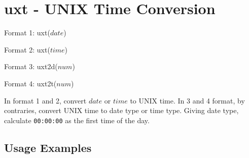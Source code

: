 %

\section{uxt - UNIX Time Conversion\label{sect:uxt}}

Format 1: uxt($date$)

Format 2: uxt($time$)

Format 3: uxt2d($num$)

Format 4: uxt2t($num$)

In format 1 and 2, convert $date$ or $time$ to UNIX time. In 3 and 4 format, by contraries, convert UNIX time to date type or time type. Giving date type, calculate \verb|00:00:00| as the first time of the day.

\subsection*{Usage Examples}


%

